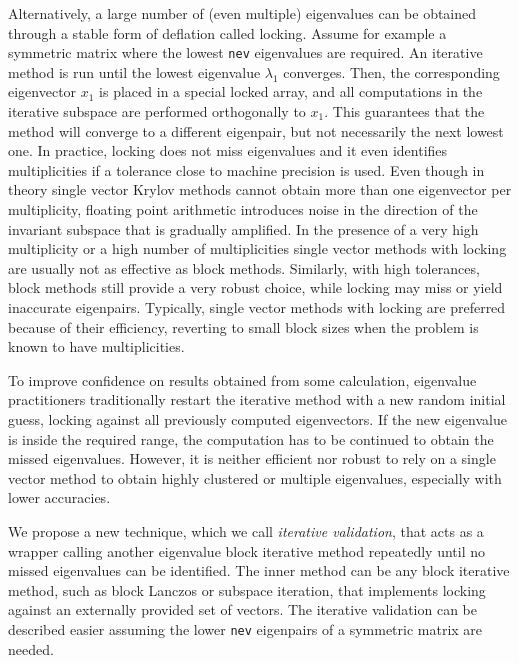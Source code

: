 \documentclass{report}
\begin{document}
Alternatively, a large number of (even multiple) eigenvalues can be
obtained through a stable form of deflation called locking.
Assume for example a symmetric matrix where the lowest {\tt nev}
eigenvalues are required.
An iterative method is run until the lowest eigenvalue $\lambda_1$ converges.
Then, the corresponding eigenvector $x_1$ is placed in a special locked array,
and all computations in the iterative subspace are performed orthogonally
to $x_1$.
This guarantees that the method will converge to a different eigenpair,
but not necessarily the next lowest one.
In practice, locking does not miss eigenvalues and it even identifies
multiplicities if a tolerance close to machine precision is used.
Even though in theory single vector Krylov methods cannot obtain
more than one eigenvector per multiplicity, floating point arithmetic
introduces noise in the direction of the invariant subspace
that is gradually amplified.
In the presence of a very high multiplicity or a high number of multiplicities
single vector methods with locking are usually not as effective as
block methods.
Similarly, with high tolerances, block methods still provide a very
robust choice, while locking may miss or yield inaccurate eigenpairs.
Typically, single vector methods with locking are preferred because of
their efficiency, reverting to small block sizes when the problem is
known to have multiplicities.

To improve confidence on results obtained from some calculation,
eigenvalue practitioners traditionally restart the iterative method
with a new random initial guess, locking against all previously computed
eigenvectors.
If the new eigenvalue is inside the required range, the computation has
to be continued to obtain the missed eigenvalues.
However, it is neither efficient nor robust to rely on a single
vector method to obtain highly clustered or multiple eigenvalues, especially
with lower accuracies.

We propose a new technique, which we call {\it iterative validation},
that acts as a wrapper calling another eigenvalue block iterative method
repeatedly until no missed eigenvalues can be identified.
The inner method can be any block iterative method, such as
block Lanczos or subspace iteration, that implements locking against
an externally provided set of vectors.
The iterative validation can be described easier assuming the lower {\tt nev}
eigenpairs of a symmetric matrix are needed.
\end{document}
